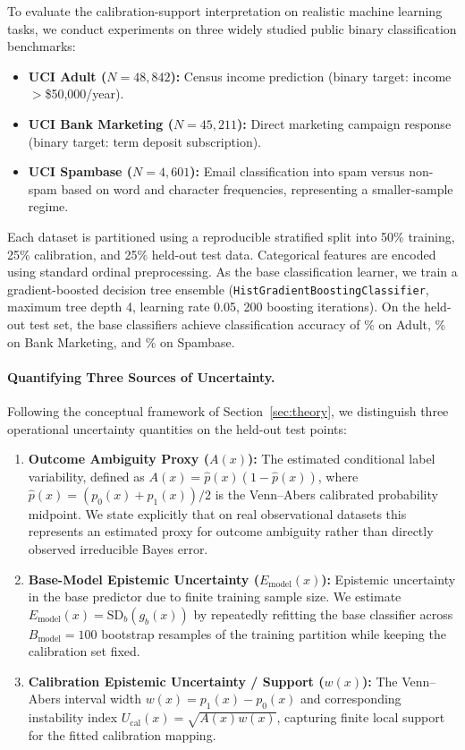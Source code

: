 \documentclass[11pt]{article}
\begin{document}
	To evaluate the calibration-support interpretation on realistic machine learning tasks, we conduct experiments on three widely studied public binary classification benchmarks:
	\begin{itemize}
		\item \textbf{UCI Adult ($N=48{,}842$):} Census income prediction (binary target: income $>$\$50{,}000/year).
		\item \textbf{UCI Bank Marketing ($N=45{,}211$):} Direct marketing campaign response (binary target: term deposit subscription).
		\item \textbf{UCI Spambase ($N=4{,}601$):} Email classification into spam versus non-spam based on word and character frequencies, representing a smaller-sample regime.
	\end{itemize}
	Each dataset is partitioned using a reproducible stratified split into 50\% training, 25\% calibration, and 25\% held-out test data. Categorical features are encoded using standard ordinal preprocessing. As the base classification learner, we train a gradient-boosted decision tree ensemble (\texttt{HistGradientBoostingClassifier}, maximum tree depth 4, learning rate 0.05, 200 boosting iterations). On the held-out test set, the base classifiers achieve classification accuracy of \AdultAccuracy{}\% on Adult, \BankAccuracy{}\% on Bank Marketing, and \SpambaseAccuracy{}\% on Spambase.

	\paragraph{Quantifying Three Sources of Uncertainty.}
	Following the conceptual framework of Section~\ref{sec:theory}, we distinguish three operational uncertainty quantities on the held-out test points:
	\begin{enumerate}
		\item \textbf{Outcome Ambiguity Proxy ($A(x)$):} The estimated conditional label variability, defined as $A(x) = \hat p(x)(1 - \hat p(x))$, where $\hat p(x) = (p_0(x) + p_1(x))/2$ is the Venn--Abers calibrated probability midpoint. We state explicitly that on real observational datasets this represents an estimated proxy for outcome ambiguity rather than directly observed irreducible Bayes error.
		\item \textbf{Base-Model Epistemic Uncertainty ($E_{\mathrm{model}}(x)$):} Epistemic uncertainty in the base predictor due to finite training sample size. We estimate $E_{\mathrm{model}}(x) = \mathrm{SD}_b(g_b(x))$ by repeatedly refitting the base classifier across $B_{\mathrm{model}} = 100$ bootstrap resamples of the training partition while keeping the calibration set fixed.
		\item \textbf{Calibration Epistemic Uncertainty / Support ($w(x)$):} The Venn--Abers interval width $w(x) = p_1(x) - p_0(x)$ and corresponding instability index $U_{\mathrm{cal}}(x) = \sqrt{A(x) w(x)}$, capturing finite local support for the fitted calibration mapping.
	\end{enumerate}
\end{document}
